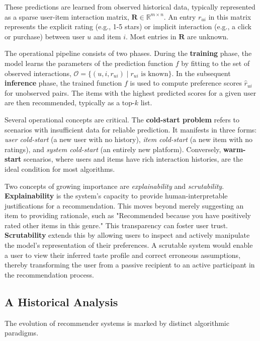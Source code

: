 These predictions are learned from observed historical data, typically represented as a sparse user-item interaction matrix, $\mathbf{R} \in \mathbb{R}^{m \times n}$. An entry $r_{ui}$ in this matrix represents the explicit rating (e.g., 1-5 stars) or implicit interaction (e.g., a click or purchase) between user $u$ and item $i$. Most entries in $\mathbf{R}$ are unknown.

The operational pipeline consists of two phases. During the \textbf{training} phase, the model learns the parameters of the prediction function $f$ by fitting to the set of observed interactions, $\mathcal{O} = \{(u, i, r_{ui}) \mid r_{ui} \text{ is known}\}$. In the subsequent \textbf{inference} phase, the trained function $f$ is used to compute preference scores $\hat{r}_{ui}$ for unobserved pairs. The items with the highest predicted scores for a given user are then recommended, typically as a top-$k$ list.

Several operational concepts are critical. The \textbf{cold-start problem} refers to scenarios with insufficient data for reliable prediction. It manifests in three forms: \textit{user cold-start} (a new user with no history), \textit{item cold-start} (a new item with no ratings), and \textit{system cold-start} (an entirely new platform). Conversely, \textbf{warm-start} scenarios, where users and items have rich interaction histories, are the ideal condition for most algorithms.

Two concepts of growing importance are \textit{explainability} and \textit{scrutability}. \textbf{Explainability} is the system's capacity to provide human-interpretable justifications for a recommendation. This moves beyond merely suggesting an item to providing rationale, such as "Recommended because you have positively rated other items in this genre." This transparency can foster user trust. \textbf{Scrutability} extends this by allowing users to inspect and actively manipulate the model's representation of their preferences. A scrutable system would enable a user to view their inferred taste profile and correct erroneous assumptions, thereby transforming the user from a passive recipient to an active participant in the recommendation process.


\subsection{A Historical Analysis}

The evolution of recommender systems is marked by distinct algorithmic paradigms.

